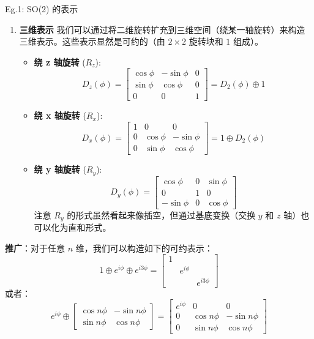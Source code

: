 \begin{example}{Eg.1: SO(2) 的表示}
\begin{enumerate}
        \item \textbf{三维表示}
    我们可以通过将二维旋转扩充到三维空间（绕某一轴旋转）来构造三维表示。这些表示显然是可约的（由 $2 \times 2$ 旋转块和 $1$ 组成）。
    \begin{itemize}
        \item \textbf{绕 z 轴旋转} ($R_z$):
        \begin{equation}
            D_z(\phi) = \begin{bmatrix} \cos\phi & -\sin\phi & 0 \\ \sin\phi & \cos\phi & 0 \\ 0 & 0 & 1 \end{bmatrix} = D_2(\phi) \oplus 1
        \end{equation}
        \item \textbf{绕 x 轴旋转} ($R_x$):
        \begin{equation}
            D_x(\phi) = \begin{bmatrix} 1 & 0 & 0 \\ 0 & \cos\phi & -\sin\phi \\ 0 & \sin\phi & \cos\phi \end{bmatrix} = 1 \oplus D_2(\phi)
        \end{equation}
        \item \textbf{绕 y 轴旋转} ($R_y$):
        \begin{equation}
            D_y(\phi) = \begin{bmatrix} \cos\phi & 0 & \sin\phi \\ 0 & 1 & 0 \\ -\sin\phi & 0 & \cos\phi \end{bmatrix}
        \end{equation}
        注意 $R_y$ 的形式虽然看起来像插空，但通过基底变换（交换 $y$ 和 $z$ 轴）也可以化为直和形式。
    \end{itemize}
    
        \end{enumerate}
    \textbf{推广}：对于任意 $n$ 维，我们可以构造如下的可约表示：
    \begin{equation}
        1 \oplus e^{i\phi} \oplus e^{i3\phi} = \begin{bmatrix} 1 & & \\ & e^{i\phi} & \\ & & e^{i3\phi} \end{bmatrix}
    \end{equation}
    或者：
    \begin{equation}
        e^{i\phi} \oplus \begin{bmatrix} \cos n\phi & -\sin n\phi \\ \sin n\phi & \cos n\phi \end{bmatrix} = \begin{bmatrix} e^{i\phi} & 0 & 0 \\ 0 & \cos n\phi & -\sin n\phi \\ 0 & \sin n\phi & \cos n\phi \end{bmatrix}
    \end{equation}
\end{example}

